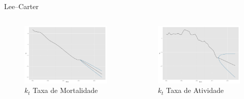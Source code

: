 \documentclass{beamer}
\begin{document}
\begin{frame}{Lee--Carter}
	\begin{columns}[c]
	\column{6cm}
	\begin{figure}
		\caption{$k_{t}$ Taxa de Mortalidade}
		\includegraphics[width=\textwidth]{Graphs/DR_LC_kt_f.pdf}
	\end{figure}
	\column{6cm}
	\begin{figure}
		\caption{$k_{t}$ Taxa de Atividade}
		\includegraphics[width=\textwidth]{Graphs/LFPR_LC_kt_f.pdf}
	\end{figure}
	\end{columns}  
\end{frame}
\end{document}
